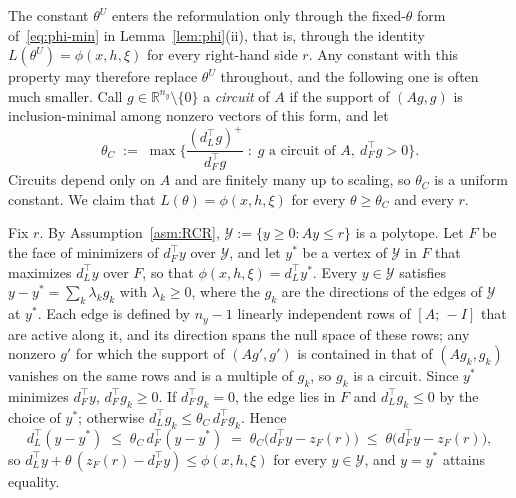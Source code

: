
\begin{remark}\label{rem:theta-circuit}
The constant $\theta^{U}$ enters the reformulation only through the
fixed-$\theta$ form of~\eqref{eq:phi-min} in Lemma~\ref{lem:phi}(ii), that is,
through the identity $L(\theta^{U}) = \phi(x,h,\xi)$ for every right-hand side
$r$. Any constant with this property may therefore replace $\theta^{U}$
throughout, and the following one is often much smaller. Call
$g \in \mathbb{R}^{n_y}\setminus\{0\}$ a \emph{circuit} of $A$ if the support
of $(Ag, g)$ is inclusion-minimal among nonzero vectors of this form, and let
\[
    \theta_{C} \;:=\; \max\Big\{ \frac{(d_L^\top g)^{+}}{d_F^\top g} \;:\; g \text{ a circuit of } A,\ d_F^\top g > 0 \Big\}.
\]
Circuits depend only on $A$ and are finitely many up to scaling, so $\theta_{C}$
is a uniform constant. We claim that $L(\theta) = \phi(x,h,\xi)$ for every
$\theta \ge \theta_{C}$ and every $r$.

Fix $r$. By Assumption~\ref{asm:RCR}, $\mathcal{Y} := \{y \ge 0 : Ay \le r\}$
is a polytope. Let $F$ be the face of minimizers of $d_F^\top y$ over
$\mathcal{Y}$, and let $y^{*}$ be a vertex of $\mathcal{Y}$ in $F$ that
maximizes $d_L^\top y$ over $F$, so that $\phi(x,h,\xi) = d_L^\top y^{*}$.
Every $y \in \mathcal{Y}$ satisfies $y - y^{*} = \sum_{k}\lambda_k g_k$ with
$\lambda_k \ge 0$, where the $g_k$ are the directions of the edges of
$\mathcal{Y}$ at $y^{*}$. Each edge is defined by $n_y - 1$ linearly
independent rows of $[A;\,-I]$ that are active along it, and its direction
spans the null space of these rows; any nonzero $g'$ for which the support of
$(Ag', g')$ is contained in that of $(Ag_k, g_k)$ vanishes on the same rows and
is a multiple of $g_k$, so $g_k$ is a circuit. Since $y^{*}$ minimizes
$d_F^\top y$, $d_F^\top g_k \ge 0$. If $d_F^\top g_k = 0$, the edge lies in
$F$ and $d_L^\top g_k \le 0$ by the choice of $y^{*}$; otherwise
$d_L^\top g_k \le \theta_{C}\, d_F^\top g_k$. Hence
\[
    d_L^\top (y - y^{*}) \;\le\; \theta_{C}\, d_F^\top (y - y^{*}) \;=\; \theta_{C}\big(d_F^\top y - z_F(r)\big)
    \;\le\; \theta\big(d_F^\top y - z_F(r)\big),
\]
so $d_L^\top y + \theta\,(z_F(r) - d_F^\top y) \le \phi(x,h,\xi)$ for every
$y \in \mathcal{Y}$, and $y = y^{*}$ attains equality.


\end{remark}
